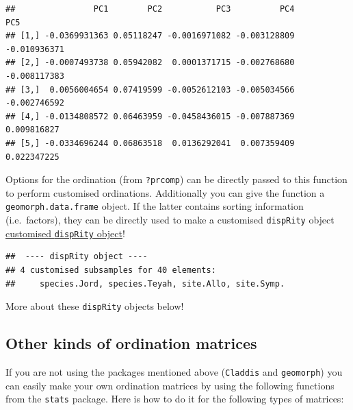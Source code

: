 \documentclass[]{book}
\newenvironment{Shaded}{\begin{snugshade}}{\end{snugshade}}
\newcommand{\KeywordTok}[1]{\textcolor[rgb]{0.13,0.29,0.53}{\textbf{#1}}}
\newcommand{\DataTypeTok}[1]{\textcolor[rgb]{0.13,0.29,0.53}{#1}}
\newcommand{\StringTok}[1]{\textcolor[rgb]{0.31,0.60,0.02}{#1}}
\newcommand{\OperatorTok}[1]{\textcolor[rgb]{0.81,0.36,0.00}{\textbf{#1}}}
\newcommand{\NormalTok}[1]{#1}
\theoremstyle{definition}
\theoremstyle{definition}
\theoremstyle{remark}
\begin{document}
\begin{verbatim}
##                PC1        PC2           PC3          PC4          PC5
## [1,] -0.0369931363 0.05118247 -0.0016971082 -0.003128809 -0.010936371
## [2,] -0.0007493738 0.05942082  0.0001371715 -0.002768680 -0.008117383
## [3,]  0.0056004654 0.07419599 -0.0052612103 -0.005034566 -0.002746592
## [4,] -0.0134808572 0.06463959 -0.0458436015 -0.007887369  0.009816827
## [5,] -0.0334696244 0.06863518  0.0136292041  0.007359409  0.022347225
\end{verbatim}

Options for the ordination (from \texttt{?prcomp}) can be directly
passed to this function to perform customised ordinations. Additionally
you can give the function a \texttt{geomorph.data.frame} object. If the
latter contains sorting information (i.e.~factors), they can be directly
used to make a customised \texttt{dispRity} object
\protect\hyperlink{customised-subsamples}{customised \texttt{dispRity}
object}!

\begin{Shaded}
\end{Shaded}

\begin{verbatim}
##  ---- dispRity object ---- 
## 4 customised subsamples for 40 elements:
##     species.Jord, species.Teyah, site.Allo, site.Symp.
\end{verbatim}

More about these \texttt{dispRity} objects below!

\subsection{Other kinds of ordination
matrices}\label{other-kinds-of-ordination-matrices}

If you are not using the packages mentioned above (\texttt{Claddis} and
\texttt{geomorph}) you can easily make your own ordination matrices by
using the following functions from the \texttt{stats} package. Here is
how to do it for the following types of matrices:
\end{document}
